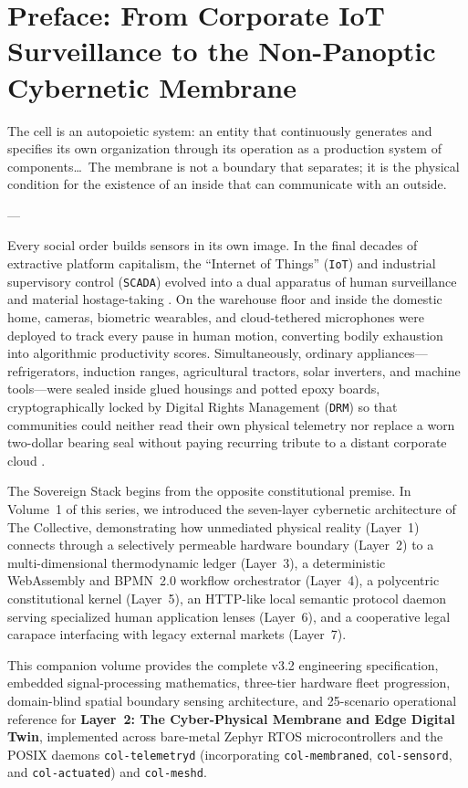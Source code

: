 \chapter*{Preface: From Corporate IoT Surveillance to the Non-Panoptic Cybernetic Membrane}

\epigraph{The cell is an autopoietic system: an entity that continuously generates and specifies its own organization through its operation as a production system of components\dots\ The membrane is not a boundary that separates; it is the physical condition for the existence of an inside that can communicate with an outside.}{--- \textcite{maturana1980}}

Every social order builds sensors in its own image. In the final decades of extractive platform capitalism, the ``Internet of Things'' (\texttt{IoT}) and industrial supervisory control (\texttt{SCADA}) evolved into a dual apparatus of human surveillance and material hostage-taking \parencite{zuboff2019,han2015}. On the warehouse floor and inside the domestic home, cameras, biometric wearables, and cloud-tethered microphones were deployed to track every pause in human motion, converting bodily exhaustion into algorithmic productivity scores. Simultaneously, ordinary appliances---refrigerators, induction ranges, agricultural tractors, solar inverters, and machine tools---were sealed inside glued housings and potted epoxy boards, cryptographically locked by Digital Rights Management (\texttt{DRM}) so that communities could neither read their own physical telemetry nor replace a worn two-dollar bearing seal without paying recurring tribute to a distant corporate cloud \parencite{illich1973}.

The Sovereign Stack begins from the opposite constitutional premise. In Volume~1 of this series, we introduced the seven-layer cybernetic architecture of The Collective, demonstrating how unmediated physical reality (Layer~1) connects through a selectively permeable hardware boundary (Layer~2) to a multi-dimensional thermodynamic ledger (Layer~3), a deterministic WebAssembly and BPMN~2.0 workflow orchestrator (Layer~4), a polycentric constitutional kernel (Layer~5), an HTTP-like local semantic protocol daemon serving specialized human application lenses (Layer~6), and a cooperative legal carapace interfacing with legacy external markets (Layer~7).

This companion volume provides the complete v3.2 engineering specification, embedded signal-processing mathematics, three-tier hardware fleet progression, domain-blind spatial boundary sensing architecture, and 25-scenario operational reference for \textbf{Layer~2: The Cyber-Physical Membrane and Edge Digital Twin}, implemented across bare-metal Zephyr RTOS microcontrollers and the POSIX daemons \texttt{col-telemetryd} (incorporating \texttt{col-membraned}, \texttt{col-sensord}, and \texttt{col-actuated}) and \texttt{col-meshd}.

